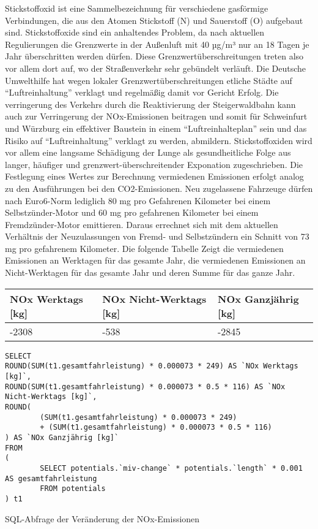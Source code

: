 \documentclass[fontsize=12pt,a4paper]{scrreprt}
\begin{document}
Stickstoffoxid ist eine Sammelbezeichnung für verschiedene gasförmige Verbindungen, die aus den Atomen Stickstoff (N) und Sauerstoff (O) aufgebaut sind.
\newline
\newline
Stickstoffoxide sind ein anhaltendes Problem, da nach aktuellen Regulierungen die Grenzwerte in der Außenluft mit 40 µg/m³ nur an 18 Tagen je Jahr überschritten werden dürfen. Diese Grenzwertüberschreitungen treten also vor allem dort auf, wo der Straßenverkehr sehr gebündelt verläuft. Die Deutsche Umwelthilfe hat wegen lokaler Grenzwertüberschreitungen etliche Städte auf \enquote{Luftreinhaltung} verklagt und regelmäßig damit vor Gericht Erfolg. Die verringerung des Verkehrs durch die Reaktivierung der Steigerwaldbahn kann auch zur Verringerung der NOx-Emissionen beitragen und somit für Schweinfurt und Würzburg ein effektiver Baustein in einem \enquote{Luftreinhalteplan} sein und das Risiko auf \enquote{Luftreinhaltung} verklagt zu werden, abmildern.
\newline
\newline
Stickstoffoxiden wird vor allem eine langsame Schädigung der Lunge als gesundheitliche Folge aus langer, häufiger und grenzwert-überschreitender Exponation zugeschrieben.
\newline
\newline
Die Festlegung eines Wertes zur Berechnung vermiedenen Emissionen erfolgt analog zu den Ausführungen bei den CO2-Emissionen. Neu zugelassene Fahrzeuge dürfen nach Euro6-Norm lediglich 80 mg pro Gefahrenen Kilometer bei einem Selbstzünder-Motor und 60 mg pro gefahrenen Kilometer bei einem Fremdzünder-Motor emittieren. Daraus errechnet sich mit dem aktuellen Verhältnis der Neuzulassungen von Fremd- und Selbstzündern ein Schnitt von 73 mg pro gefahrenem Kilometer.
\newline
\newline
Die folgende Tabelle Zeigt die vermiedenen Emissionen an Werktagen für das gesamte Jahr, die vermiedenen Emissionen an Nicht-Werktagen für das gesamte Jahr und deren Summe für das ganze Jahr.
\newline
\newline
\begin{tabular}{|l | l | l |}
\hline
NOx Werktags [kg] & NOx Nicht-Werktags [kg] & NOx Ganzjährig [kg]\\ 
\hline
-2308 & -538 & -2845\\ 
\hline
\end{tabular}

\begin{listing}[htbp]
\begin{verbatim}
SELECT 
ROUND(SUM(t1.gesamtfahrleistung) * 0.000073 * 249) AS `NOx Werktags [kg]`, 
ROUND(SUM(t1.gesamtfahrleistung) * 0.000073 * 0.5 * 116) AS `NOx Nicht-Werktags [kg]`, 
ROUND(
        (SUM(t1.gesamtfahrleistung) * 0.000073 * 249) 
        + (SUM(t1.gesamtfahrleistung) * 0.000073 * 0.5 * 116)
) AS `NOx Ganzjährig [kg]`
FROM
(
        SELECT potentials.`miv-change` * potentials.`length` * 0.001 AS gesamtfahrleistung
        FROM potentials
) t1
\end{verbatim}
\caption{SQL-Abfrage der Veränderung der NOx-Emissionen}\label{lst-emmissionen-nox}
\end{listing}
\end{document}
